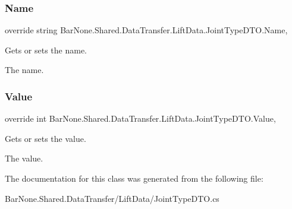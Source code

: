 \subsubsection{\texorpdfstring{Name}{Name}}
{\footnotesize\ttfamily override string Bar\+None.\+Shared.\+Data\+Transfer.\+Lift\+Data.\+Joint\+Type\+D\+T\+O.\+Name\hspace{0.3cm}{\ttfamily [get]}, {\ttfamily [set]}}



Gets or sets the name. 

The name. \mbox{\label{class_bar_none_1_1_shared_1_1_data_transfer_1_1_lift_data_1_1_joint_type_d_t_o_af186a6f652e713d026cdb9e061274844}} 
\subsubsection{\texorpdfstring{Value}{Value}}
{\footnotesize\ttfamily override int Bar\+None.\+Shared.\+Data\+Transfer.\+Lift\+Data.\+Joint\+Type\+D\+T\+O.\+Value\hspace{0.3cm}{\ttfamily [get]}, {\ttfamily [set]}}



Gets or sets the value. 

The value. 

The documentation for this class was generated from the following file\+:\begin{DoxyCompactItemize}
\item 
Bar\+None.\+Shared.\+Data\+Transfer/\+Lift\+Data/Joint\+Type\+D\+T\+O.\+cs\end{DoxyCompactItemize}
